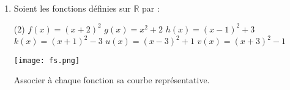 \documentclass{ap}
\begin{document}
{\begin{multicols}{2}
\begin{exo}
\begin{enumerate}
\begin{enumerate}
\item Soit $a\in \mathbb{R}$. Si $f$ et $g$ sont deux fonctions définies sur $\mathbb{R}$ par $f(x) = x^2$ et $g(x) = x^2 + a$, expliquer le lien entre $\mathcal{C}_f$ et $\mathcal{C}_g$.
  \end{enumerate}
\item Soient les fonctions définies sur $\mathbb{R}$ par :
\begin{tasks}(2)
  \task $f(x) = (x + 2)^2$
  \task $g(x) = x^2 + 2$
  \task* $h(x) = (x - 1)^2 + 3$
  \task* $k(x) = (x + 1)^2 - 3$
  \task* $u(x) = (x - 3)^2 + 1$
  \task* $v(x) = (x + 3)^2 - 1$
\end{tasks}

\texttt{[image: fs.png]}
  
Associer à chaque fonction sa courbe représentative. 
  
  \end{enumerate}
 \end{exo} 
 \vspace{1em}
\end{multicols} 
}
\end{document}
